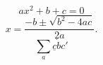 \documentclass{article}
\begin{document}
\[
  ax^2+b+c=0
\]
\[
  x = \frac{-b \pm \sqrt{b^2-4ac}}{2a}.
\]
\[
  \sum_a\underline c\dot bc'
\]
\end{document}
